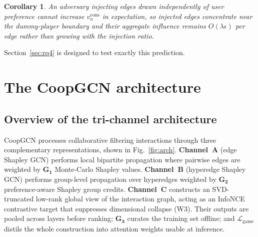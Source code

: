 \documentclass[final,5p,times,twocolumn]{elsarticle}
\newtheorem{corollary}{Corollary}
\begin{document}
\begin{corollary}
\label{cor:inject}
An adversary injecting edges drawn independently of user preference cannot
increase $v_u^{\mathrm{cons}}$ in expectation, so injected edges concentrate
near the dummy-player boundary and their aggregate influence remains
$O(\lambda\epsilon)$ per edge rather than growing with the injection ratio.
\end{corollary}

Section~\ref{sec:rq4} is designed to test exactly this prediction.

\section{The CoopGCN architecture}
\label{sec:arch}

\subsection{Overview of the tri-channel architecture}
\label{sec:overview}

CoopGCN processes collaborative filtering interactions through three
complementary representations, shown in Fig.~\ref{fig:arch}. \textbf{Channel~A}
(edge Shapley GCN) performs local bipartite propagation where pairwise edges
are weighted by $\mathbf{G_1}$ Monte-Carlo Shapley values. \textbf{Channel~B}
(hyperedge Shapley GCN) performs group-level propagation over hyperedges
weighted by $\mathbf{G_2}$ preference-aware Shapley group credits.
\textbf{Channel~C} constructs an SVD-truncated low-rank global view of the
interaction graph, acting as an InfoNCE contrastive target that suppresses
dimensional collapse (W3). Their outputs are pooled across layers before
ranking; $\mathbf{G_3}$ curates the training set offline; and
$\mathcal{L}_{\mathrm{game}}$ distils the whole construction into attention
weights usable at inference.
\end{document}
